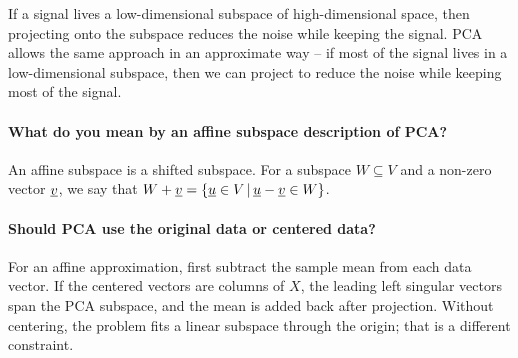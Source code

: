 \documentclass[10pt,english]{article}
\begin{document}
If a signal lives a low-dimensional subspace of high-dimensional space, then projecting onto the subspace reduces the noise while keeping the signal.
PCA allows the same approach in an approximate way -- if most of the signal lives in a low-dimensional subspace, then we can project to reduce the noise while keeping most of the signal.

\paragraph{What do you mean by an affine subspace description of PCA?}

An affine subspace is a shifted subspace.
For a subspace $W \subseteq V$ and a non-zero vector $\underline{v}$, we say that $W+\underline{v} = \{ \underline{u} \in V \,|\, \underline{u}-\underline{v} \in W \}$.


\paragraph{Should PCA use the original data or centered data?}
For an affine approximation, first subtract the sample mean from each data vector.
If the centered vectors are columns of $X$, the leading left singular vectors span the PCA subspace, and the mean is added back after projection.
Without centering, the problem fits a linear subspace through the origin; that is a different constraint.
\end{document}
